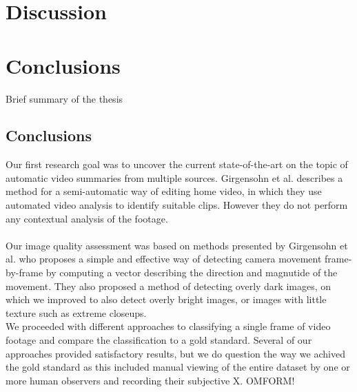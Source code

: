 \chapter{Discussion}
%
%
\chapter{Conclusions}
%
%
Brief summary of the thesis
%
\section{Conclusions}\label{sec:conc_concs}
%
Our first research goal was to uncover the current state-of-the-art on the topic of automatic video summaries from multiple sources. Girgensohn et al.\cite{Girgensohn:2000:SAH:354401.354415} describes a method for a semi-automatic way of editing home video, in which they use automated video analysis to identify suitable clips. However they do not perform any contextual analysis of the footage.\\\\
Our image quality assessment was based on methods presented by Girgensohn et al.\cite{Girgensohn:2000:SAH:354401.354415} who proposes a simple and effective way of detecting camera movement frame-by-frame by computing a vector describing the direction and magnutide of the movement. They also proposed a method of detecting overly dark images, on which we improved to also detect overly bright images, or images with little texture such as extreme closeups.\\
We proceeded with different approaches to classifying a single frame of video footage and compare the classification to a gold standard. Several of our approaches provided satisfactory results, but we do question the way we achived the gold standard as this included manual viewing of the entire dataset by one or more human observers and recording their subjective X. OMFORM!\\
